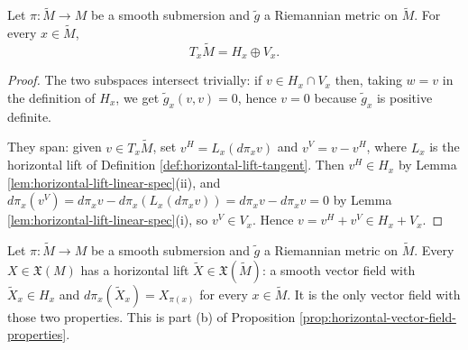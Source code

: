 \begin{lemma}
\label{lem:tangent-space-horizontal-vertical-splitting}
\leanok
{}
Let $\pi : \tilde{M} \to M$ be a smooth submersion and $\tilde{g}$ a Riemannian metric on $\tilde{M}$. For every $x \in \tilde{M}$,
\[
T_x\tilde{M} = H_x \oplus V_x .
\]
\end{lemma}

\begin{proof}
\leanok
{}
The two subspaces intersect trivially: if $v \in H_x \cap V_x$ then, taking $w = v$ in the definition of $H_x$, we get $\tilde{g}_x(v,v) = 0$, hence $v = 0$ because $\tilde{g}_x$ is positive definite.

They span: given $v \in T_x\tilde{M}$, set $v^H = L_x(d\pi_x v)$ and $v^V = v - v^H$, where $L_x$ is the horizontal lift of Definition \ref{def:horizontal-lift-tangent}. Then $v^H \in H_x$ by Lemma \ref{lem:horizontal-lift-linear-spec}(ii), and $d\pi_x(v^V) = d\pi_x v - d\pi_x(L_x(d\pi_x v)) = d\pi_x v - d\pi_x v = 0$ by Lemma \ref{lem:horizontal-lift-linear-spec}(i), so $v^V \in V_x$. Hence $v = v^H + v^V \in H_x + V_x$.
\end{proof}

\begin{proposition}
\label{prop:horizontal-lift-of-vector-field}
\leanok
{}
Let $\pi : \tilde{M} \to M$ be a smooth submersion and $\tilde{g}$ a Riemannian metric on $\tilde{M}$. Every $X \in \mathfrak{X}(M)$ has a horizontal lift $\tilde{X} \in \mathfrak{X}(\tilde{M})$: a smooth vector field with $\tilde{X}_x \in H_x$ and $d\pi_x(\tilde{X}_x) = X_{\pi(x)}$ for every $x \in \tilde{M}$. It is the only vector field with those two properties. This is part (b) of Proposition \ref{prop:horizontal-vector-field-properties}.
\end{proposition}

